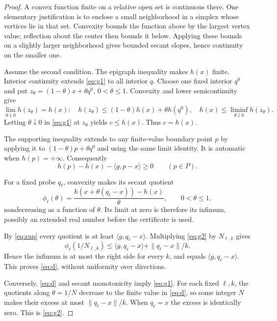 \documentclass[11pt,a4paper]{article}
\begin{document}
\begin{proof}
A convex function finite on a relative open set is continuous there.
One elementary justification is to enclose a small neighborhood in a simplex
whose vertices lie in that set. Convexity bounds the function above by the
largest vertex value; reflection about the center then bounds it below.
Applying these bounds on a slightly larger neighborhood gives bounded secant
slopes, hence continuity on the smaller one.

Assume the second condition. The epigraph inequality makes \(h(x)\) finite.
Interior continuity extends \eqref{eq:g1} to all interior \(q\). Choose one fixed
interior \(q^0\) and put \(z_\theta=(1-\theta)x+\theta q^0\), \(0<\theta\le1\).
Convexity and lower semicontinuity give
\[
\lim_{\theta\downarrow0}h(z_\theta)=h(x):
\quad h(z_\theta)\le(1-\theta)h(x)+\theta h(q^0),
\quad h(x)\le\liminf_{\theta\downarrow0}h(z_\theta).
\]
Letting \(\theta\downarrow0\) in \eqref{eq:g1} at \(z_\theta\) yields \(c\le h(x)\).
Thus \(c=h(x)\).

The supporting inequality extends to any finite-value boundary point \(p\)
by applying it to \((1-\theta)p+\theta q^0\) and using the same limit identity.
It is automatic when \(h(p)=+\infty\). Consequently
\begin{equation}
h(p)-h(x)-\langle g,p-x\rangle\ge0\qquad(p\in P).
\label{eq:sup}
\end{equation}
\begin{samepage}
For a fixed probe \(q_\ell\), convexity makes its secant quotient
\[
\phi_\ell(\theta)=\frac{h(x+\theta(q_\ell-x))-h(x)}{\theta},
\qquad 0<\theta\le1,
\]
nondecreasing as a function of \(\theta\). Its limit at zero is therefore its
infimum, possibly an extended real number before the certificate is used.
\end{samepage}
By \eqref{eq:sup} every quotient is at least \(\langle g,q_\ell-x\rangle\).
Multiplying \eqref{eq:g2} by \(N_{\ell,k}\) gives
\[
\phi_\ell(1/N_{\ell,k})
\le\langle g,q_\ell-x\rangle+\|q_\ell-x\|/k.
\]
Hence the infimum is at most the right side for every \(k\), and equals
\(\langle g,q_\ell-x\rangle\). This proves \eqref{eq:d}, without uniformity
over directions.

Conversely, \eqref{eq:d} and secant monotonicity imply \eqref{eq:g1}. For each fixed
\(\ell,k\), the quotients along \(\theta=1/N\) decrease to the finite value
in \eqref{eq:d}, so some integer \(N\) makes their excess at most
\(\|q_\ell-x\|/k\). When \(q_\ell=x\) the excess is identically zero.
This is \eqref{eq:g2}.
\end{proof}
\end{document}
